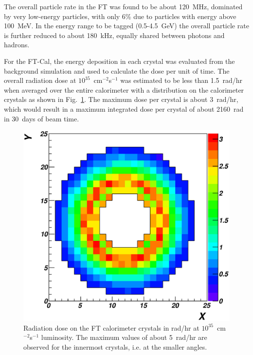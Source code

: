 The overall particle rate in the FT was found to be about 120~MHz, dominated by very low-energy particles, with
only 6\% due to particles with energy above 100~MeV. In the energy range to be tagged (0.5-4.5~GeV) the overall
particle rate is further reduced to about 180~kHz, equally shared between photons and hadrons. 

For the FT-Cal, the energy deposition in each crystal was evaluated from the background simulation and used to
calculate the dose per unit of time. The overall radiation dose at $10^{35}$~cm$^{-2}$s$^{-1}$ was estimated to be
less than 1.5~rad/hr when averaged over the entire calorimeter with a distribution on the calorimeter crystals as
shown in Fig.~\ref{fig:ft_rad}. The maximum dose per crystal is about 3~rad/hr, which would result in a maximum
integrated dose per crystal of about 2160~rad in 30~days of beam time.

\begin{figure}
\includegraphics[height=0.9\columnwidth]{fig/ft_rad.eps}
\caption{Radiation dose on the FT calorimeter crystals in rad/hr at $10^{35}$~cm$^{-2}$s$^{-1}$ luminosity. The
  maximum values of about 5~rad/hr are observed for the innermost crystals, i.e. at the smaller angles.}
\label{fig:ft_rad}
\end{figure}
